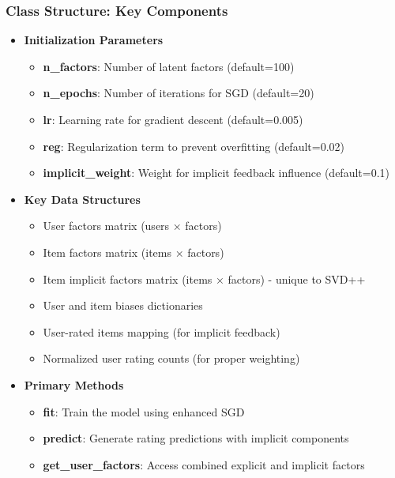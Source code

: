 \documentclass{beamer}
\begin{document}
\begin{frame}
\frametitle{Class Structure: Key Components}

\begin{itemize}
    \item \textbf{Initialization Parameters}
    \begin{itemize}
        \item \textbf{n\_factors}: Number of latent factors (default=100)
        \item \textbf{n\_epochs}: Number of iterations for SGD (default=20)
        \item \textbf{lr}: Learning rate for gradient descent (default=0.005)
        \item \textbf{reg}: Regularization term to prevent overfitting (default=0.02)
        \item \textbf{implicit\_weight}: Weight for implicit feedback influence (default=0.1)
    \end{itemize}
    
    \item \textbf{Key Data Structures}
    \begin{itemize}
        \item User factors matrix (users × factors)
        \item Item factors matrix (items × factors)
        \item Item implicit factors matrix (items × factors) - unique to SVD++
        \item User and item biases dictionaries
        \item User-rated items mapping (for implicit feedback)
        \item Normalized user rating counts (for proper weighting)
    \end{itemize}
    
    \item \textbf{Primary Methods}
    \begin{itemize}
        \item \textbf{fit}: Train the model using enhanced SGD
        \item \textbf{predict}: Generate rating predictions with implicit components
        \item \textbf{get\_user\_factors}: Access combined explicit and implicit factors
    \end{itemize}
\end{itemize}
\end{frame}
\end{document}
